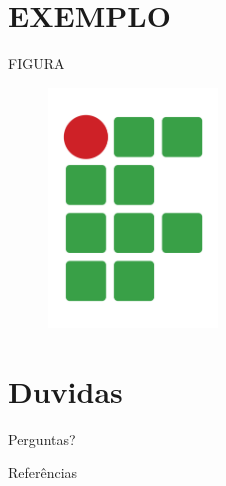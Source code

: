 \documentclass[xcolor={table}]{beamer}
\begin{document}
\section{EXEMPLO}
\begin{frame}{FIGURA}
\begin{figure}[h!]
    \includegraphics[width=0.4\textwidth, trim=0cm 0cm 0cm 0cm]{fig/Logomarca_IFSP.jpg}
    \end{figure}
\end{frame}
\section{Duvidas}
\begin{frame}{Perguntas?}
\end{frame}


\begin{frame}{Referências}
	\def\newblock{}
	
	
\end{frame}
\end{document}
